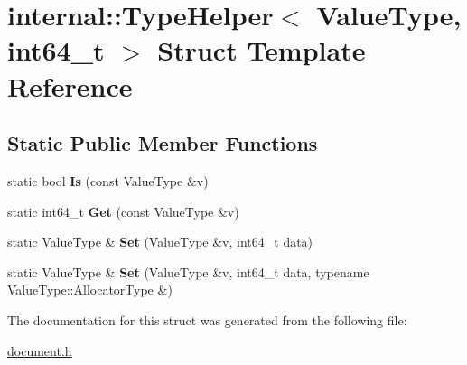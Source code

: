 \hypertarget{a02040}{}\section{internal\+:\+:Type\+Helper$<$ Value\+Type, int64\+\_\+t $>$ Struct Template Reference}
\label{a02040}
\subsection*{Static Public Member Functions}
\begin{DoxyCompactItemize}
\item 
\mbox{\label{a02040_a43c171bfbe873941a1b2be698a95de74}} 
static bool {\bfseries Is} (const Value\+Type \&v)
\item 
\mbox{\label{a02040_abe3368c8817cafe420a8b3f7d6ec1759}} 
static int64\+\_\+t {\bfseries Get} (const Value\+Type \&v)
\item 
\mbox{\label{a02040_a0c7b71569c12346902a396111782b12b}} 
static Value\+Type \& {\bfseries Set} (Value\+Type \&v, int64\+\_\+t data)
\item 
\mbox{\label{a02040_a85471fa774b4a8f4f56c191694a7f278}} 
static Value\+Type \& {\bfseries Set} (Value\+Type \&v, int64\+\_\+t data, typename Value\+Type\+::\+Allocator\+Type \&)
\end{DoxyCompactItemize}


The documentation for this struct was generated from the following file\+:\begin{DoxyCompactItemize}
\item 
\hyperlink{a00476}{document.\+h}\end{DoxyCompactItemize}
